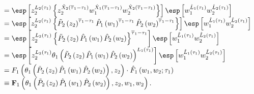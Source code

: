 \begin{eqnarray*}
\begin{array}{l}
=\esp\left[z_{2}^{L_{2}\left(\tau_{1}\right)}\left\{z_{2}^{\tilde{X}_{2}\left(\overline{\tau}_{1}-\tau_{1}\right)}w_{1}^{\hat{X}_{1}\left(\overline{\tau}_{1}
-\tau_{1}\right)}
w_{2}^{\hat{X}_{2}\left(\overline{\tau}_{1}-\tau_{1}\right)}\right\}\right]\esp\left[w_{1}^{\hat{L}_{1}\left(\tau_{1}\right)}
w_{2}^{\hat{L}_{2}\left(\tau_{1}\right)}\right]\\
=\esp\left[z_{2}^{L_{2}\left(\tau_{1}\right)}\left\{\tilde{P}_{2}\left(z_{2}\right)
^{\overline{\tau}_{1}-\tau_{1}}\hat{P}_{1}\left(w_{1}\right)^{\overline{\tau}_{1}-
\tau_{1}}\hat{P}_{2}\left(w_{2}\right)^{\overline{\tau}_{1}-\tau_{1}}\right\}\right]
\esp\left[w_{1}^{\hat{L}_{1}\left(\tau_{1}\right)}w_{2}^{\hat{L}_{2}\left(\tau_{1}\right)}\right]\\
=\esp\left[z_{2}^{L_{2}\left(\tau_{1}\right)}\left\{\tilde{P}_{2}\left(z_{2}\right)\hat{P}_{1}\left(w_{1}\right)\hat{P}_{2}\left(w_{2}\right)\right\}^{\overline{\tau}_{1}-\tau_{1}}\right]\esp\left[w_{1}^{\hat{L}_{1}\left(\tau_{1}\right)}w_{2}^{\hat{L}_{2}\left(\tau_{1}\right)}\right]\\
=\esp\left[z_{2}^{L_{2}\left(\tau_{1}\right)}\theta_{1}\left(\tilde{P}_{2}\left(z_{2}\right)\hat{P}_{1}\left(w_{1}\right)\hat{P}_{2}\left(w_{2}\right)\right)
^{L_{1}\left(\tau_{1}\right)}\right]\esp\left[w_{1}^{\hat{L}_{1}\left(\tau_{1}\right)}w_{2}^{\hat{L}_{2}\left(\tau_{1}\right)}\right]\\
=F_{1}\left(\theta_{1}\left(\tilde{P}_{2}\left(z_{2}\right)\hat{P}_{1}\left(w_{1}\right)\hat{P}_{2}\left(w_{2}\right)\right),z_{2}\right)\cdot
\hat{F}_{1}\left(w_{1},w_{2};\tau_{1}\right)\\
\equiv \mathbf{F}_{1}\left(\theta_{1}\left(\tilde{P}_{2}\left(z_{2}\right)\hat{P}_{1}\left(w_{1}\right)\hat{P}_{2}\left(w_{2}\right)\right),z_{2},w_{1},w_{2}\right).
\end{array}
\end{eqnarray*}

